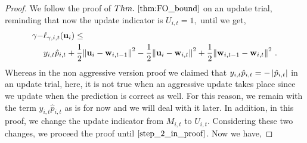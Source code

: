 {\begin{proof}
We follow the proof of $\sthmref{thm:FO_bound}$ on an update trial, reminding that now the update indicator is  $U_{i,t}=1, $ until we get,  
\begin{align*}
\gamma-&\ell_{\gamma,i,t}(\mathbf{u}_i)\le \\
&y_{i,t}\hat{p}_{i,t}+\frac{1}{2}{\left\Vert {\mathbf{u}_{i}-\mathbf{w}_{i,t-1}} \right\Vert^2}
        -\frac{1}{2}{\left\Vert {\mathbf{u}_i-\mathbf{w}_{i,t}} \right\Vert^2}+\frac{1}{2}{\left\Vert {\mathbf{w}_{i,t-1}-\mathbf{w}_{i,t}} \right\Vert^2}~.
\end{align*}
Whereas in the non aggressive version proof we claimed that $y_{i,t}\hat{p}_{i,t}=-\left\vert{\hat{p}_{i,t}}\right\vert$ in an update trial, here, it is not true when an aggressive update takes place since we update when the prediction is correct as well. For this reason, we  remain with the term $y_{i,t}\hat{p}_{i,t}$ as is for now and we will deal with it later. In addition, in this proof,  we change the update indicator from $M_{i,t}$ to $U_{i,t}$. Considering these two changes, we proceed the proof until $\eqref{step_2_in_proof}$. Now we have,



\end{proof}}
